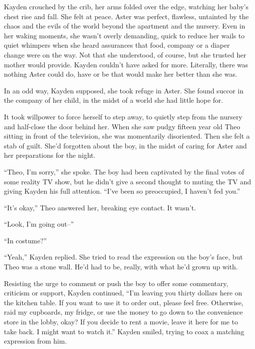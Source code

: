 





Kayden crouched by the crib, her arms folded over the edge, watching her baby's chest rise and fall.  She felt at peace.  Aster was perfect, flawless, untainted by the chaos and the evils of the world beyond the apartment and the nursery.  Even in her waking moments, she wasn't overly demanding, quick to reduce her wails to quiet whimpers when she heard assurances that food, company or a diaper change were on the way.  Not that she understood, of course, but she trusted her mother would provide.  Kayden couldn't have asked for more.  Literally, there was nothing Aster could do, have or be that would make her better than she was.



In an odd way, Kayden supposed, she took refuge in Aster.  She found succor in the company of her child, in the midst of a world she had little hope for.



It took willpower to force herself to step away, to quietly step from the nursery and half-close the door behind her.  When she saw pudgy fifteen year old Theo sitting in front of the television, she was momentarily disoriented. Then she felt a stab of guilt.  She'd forgotten about the boy, in the midst of caring for Aster and her preparations for the night.



``Theo, I'm sorry,'' she spoke.  The boy had been captivated by the final votes of some reality TV show, but he didn't give a second thought to muting the TV and giving Kayden his full attention.  ``I've been so preoccupied, I haven't fed you.''



``It's okay,'' Theo answered her, breaking eye contact.  It wasn't.



``Look, I'm going out--''



``In costume?''



``Yeah,'' Kayden replied.  She tried to read the expression on the boy's face, but Theo was a stone wall.  He'd had to be, really, with what he'd grown up with.



Resisting the urge to comment or push the boy to offer some commentary, criticism or support, Kayden continued, ``I'm leaving you thirty dollars here on the kitchen table.  If you want to use it to order out, please feel free.  Otherwise, raid my cupboards, my fridge, or use the money to go down to the convenience store in the lobby, okay?  If you decide to rent a movie, leave it here for me to take back.  I might want to watch it.''  Kayden smiled, trying to coax a matching expression from him.



